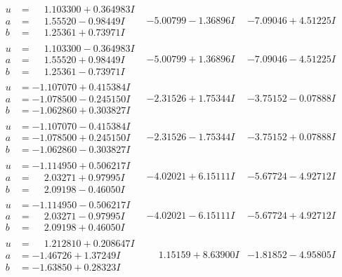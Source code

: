 \documentclass[1p]{elsarticle_modified}
\theoremstyle{definition}
\begin{document}
$$\begin{array}{c|c|c}
\begin{aligned}
u &= \phantom{-}1.103300 + 0.364983 I \\
a &= \phantom{-}1.55520 - 0.98449 I \\
b &= \phantom{-}1.25361 + 0.73971 I\end{aligned}
 & -5.00799 - 1.36896 I & -7.09046 + 4.51225 I \\ \hline\begin{aligned}
u &= \phantom{-}1.103300 - 0.364983 I \\
a &= \phantom{-}1.55520 + 0.98449 I \\
b &= \phantom{-}1.25361 - 0.73971 I\end{aligned}
 & -5.00799 + 1.36896 I & -7.09046 - 4.51225 I \\ \hline\begin{aligned}
u &= -1.107070 + 0.415384 I \\
a &= -1.078500 - 0.245150 I \\
b &= -1.062860 + 0.303827 I\end{aligned}
 & -2.31526 + 1.75344 I & -3.75152 - 0.07888 I \\ \hline\begin{aligned}
u &= -1.107070 - 0.415384 I \\
a &= -1.078500 + 0.245150 I \\
b &= -1.062860 - 0.303827 I\end{aligned}
 & -2.31526 - 1.75344 I & -3.75152 + 0.07888 I \\ \hline\begin{aligned}
u &= -1.114950 + 0.506217 I \\
a &= \phantom{-}2.03271 + 0.97995 I \\
b &= \phantom{-}2.09198 - 0.46050 I\end{aligned}
 & -4.02021 + 6.15111 I & -5.67724 - 4.92712 I \\ \hline\begin{aligned}
u &= -1.114950 - 0.506217 I \\
a &= \phantom{-}2.03271 - 0.97995 I \\
b &= \phantom{-}2.09198 + 0.46050 I\end{aligned}
 & -4.02021 - 6.15111 I & -5.67724 + 4.92712 I \\ \hline\begin{aligned}
u &= \phantom{-}1.212810 + 0.208647 I \\
a &= -1.46726 + 1.37249 I \\
b &= -1.63850 + 0.28323 I\end{aligned}
 & \phantom{-}1.15159 + 8.63900 I & -1.81852 - 4.95805 I \\ \hline\begin{aligned}

\end{aligned}
\end{array}$$
\end{document}
